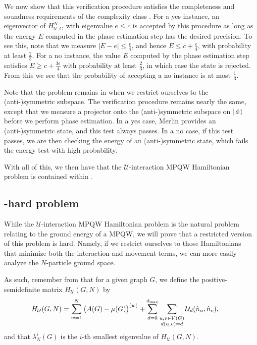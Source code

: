 \documentclass[../thesis-main/thesis-main]{subfiles}
\begin{document}
We now show that this verification procedure satisfies the completeness and soundness requirements of the complexity class \QMA. For a yes instance, an eigenvector of $H_{\mathcal{U},G}^{N}$ with eigenvalue $e\leq c$ is accepted by this procedure as long as the energy $E$ computed in the phase estimation step has the desired precision. To see this, note that we measure $\left|E-e\right|\leq\frac{\epsilon}{4}$, and hence $E\leq c+\frac{\epsilon}{4}$, with probability at least $\frac{2}{3}$.  For a no instance, the value $E$ computed by the phase estimation step satisfies $E\geq c+\frac{3\epsilon}{4}$ with probability at least $\frac{2}{3}$, in which case the state is rejected. From this we see that the probability of accepting a no instance is at most $\frac{1}{3}$.

Note that the problem remains in \QMA when we restrict ourselves to the (anti-)symmetric subspace.  The verification procedure remains nearly the same, except that we measure a projector onto the (anti-)symmetric subspace on $|\mspace{2mu} \phi \mspace{2mu} \rangle$ before we perform phase estimation.  In a yes case, Merlin provides an (anti-)symmetric state, and this test always passes.  In a no case, if this test passes, we are then checking the energy of an (anti-)symmetric state, which fails the energy test with high probability.

With all of this, we then have that the $\mathcal{U}$-interaction MPQW Hamiltonian problem is contained within \QMA.


\subsection{\QMA-hard problem}

While the $\mathcal{U}$-interaction MPQW Hamiltonian problem is the natural problem relating to the ground energy of a MPQW, we will prove that a restricted version of this problem is \QMA hard.  Namely, if we restrict ourselves to those Hamiltonians that minimize both the interaction and movement terms, we can more easily analyze the $N$-particle ground space.

As such, remember from  that for a given graph $G$, we define the positive-semidefinite matrix $H_{\mathcal{U}}(G,N)$ by
\begin{align}
  H_{\mathcal{U}}(G,N) &= \sum_{w=1}^{N} \big( A(G) - \mu(G)\big)^{(w)} + \sum_{d=0}^{d_{\text{max}}} \sum_{\substack{u,v\in V(G)\\d(u,v) = d}} \mathcal{U}_d(\hat{n}_u,\hat{n}_v),
\end{align}
and that $\lambda_N^i(G)$ is the $i$-th smallest eigenvalue of $H_{\mathcal{U}}(G,N)$.
\end{document}
